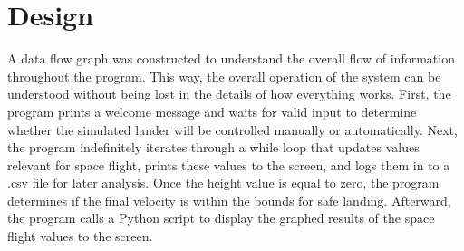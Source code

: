 \documentclass{article}
\begin{document}
\section{Design}

A data flow graph was constructed to understand the overall flow of information throughout the program. This way, the overall operation of the system can be understood without being lost in the details of how everything works. First, the program prints a welcome message and waits for valid input to determine whether the simulated lander will be controlled manually or automatically. Next, the program indefinitely iterates through a while loop that updates values relevant for space flight, prints these values to the screen, and logs them in to a .csv file for later analysis. Once the height value is equal to zero, the program determines if the final velocity is within the bounds for safe landing. Afterward, the program calls a Python script to display the graphed results of the space flight values to the screen.
\end{document}
